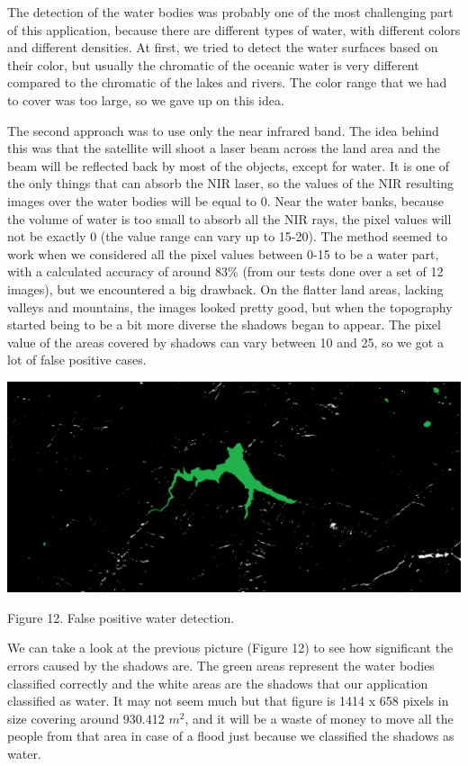 \documentclass[12pt, a4paper]{report}
\begin{document}
The detection of the water bodies was probably one of the most challenging part of this application, because there are different types of water, with different colors and different densities. At first, we tried to detect the water surfaces based on their color, but usually the chromatic of the oceanic water is very different compared to the chromatic of the lakes and rivers. The color range that we had to cover was too large, so we gave up on this idea. 
\par 
The second approach was to use only the near infrared band. The idea behind this was that the satellite will shoot a laser beam across the land area and the beam will be reflected back by most of the objects, except for water. It is one of the only things that can absorb the NIR laser, so the values of the NIR resulting images over the water bodies will be equal to 0. Near the water banks, because the volume of water is too small to absorb all the NIR rays, the pixel values will not be exactly 0 (the value range can vary up to 15-20). The method seemed to work when we considered all the pixel values between 0-15 to be a water part, with a calculated accuracy of around 83\% (from our tests done over a set of 12 images), but we encountered a big drawback. On the flatter land areas, lacking valleys and mountains, the images looked pretty good, but when the topography started being to be a bit more diverse the shadows began to appear. The pixel value of the areas covered by shadows can vary between 10 and 25, so we got a lot of false positive cases.

\bigskip
\includegraphics[scale=0.4, left]{water-false-positive.png}
\begin{center}
Figure 12. False positive water detection.
\end{center}
\par 

We can take a look at the previous picture (Figure 12) to see how significant the errors caused by the shadows are. The green areas represent the water bodies classified correctly and the white areas are the shadows that our application classified as water. It may not seem much but that figure is 1414 x 658 pixels in size covering around 930.412 $m^2$, and it will be a waste of money to move all the people from that area in case of a flood just because we classified the shadows as water.
\par 
\end{document}
